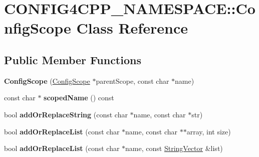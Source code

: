 \hypertarget{classCONFIG4CPP__NAMESPACE_1_1ConfigScope}{\section{C\-O\-N\-F\-I\-G4\-C\-P\-P\-\_\-\-N\-A\-M\-E\-S\-P\-A\-C\-E\-:\-:Config\-Scope Class Reference}
\label{classCONFIG4CPP__NAMESPACE_1_1ConfigScope}
}
\subsection*{Public Member Functions}
\begin{DoxyCompactItemize}
\item 
\hypertarget{classCONFIG4CPP__NAMESPACE_1_1ConfigScope_a5ea740332c7e0b1034e6d6f3f3813377}{{\bfseries Config\-Scope} (\hyperlink{classCONFIG4CPP__NAMESPACE_1_1ConfigScope}{Config\-Scope} $\ast$parent\-Scope, const char $\ast$name)}\label{classCONFIG4CPP__NAMESPACE_1_1ConfigScope_a5ea740332c7e0b1034e6d6f3f3813377}

\item 
\hypertarget{classCONFIG4CPP__NAMESPACE_1_1ConfigScope_a1f257a2251f826a2eff0be7e0a528225}{const char $\ast$ {\bfseries scoped\-Name} () const }\label{classCONFIG4CPP__NAMESPACE_1_1ConfigScope_a1f257a2251f826a2eff0be7e0a528225}

\item 
\hypertarget{classCONFIG4CPP__NAMESPACE_1_1ConfigScope_a5da51e5c55fd19e8f10102011005e488}{bool {\bfseries add\-Or\-Replace\-String} (const char $\ast$name, const char $\ast$str)}\label{classCONFIG4CPP__NAMESPACE_1_1ConfigScope_a5da51e5c55fd19e8f10102011005e488}

\item 
\hypertarget{classCONFIG4CPP__NAMESPACE_1_1ConfigScope_aef6266efa39766595d426f1d8d801407}{bool {\bfseries add\-Or\-Replace\-List} (const char $\ast$name, const char $\ast$$\ast$array, int size)}\label{classCONFIG4CPP__NAMESPACE_1_1ConfigScope_aef6266efa39766595d426f1d8d801407}

\item 
\hypertarget{classCONFIG4CPP__NAMESPACE_1_1ConfigScope_a66239a4d9ab5e093e2fa152cbadd5d09}{bool {\bfseries add\-Or\-Replace\-List} (const char $\ast$name, const \hyperlink{classCONFIG4CPP__NAMESPACE_1_1StringVector}{String\-Vector} \&list)}\label{classCONFIG4CPP__NAMESPACE_1_1ConfigScope_a66239a4d9ab5e093e2fa152cbadd5d09}


\end{DoxyCompactItemize}
